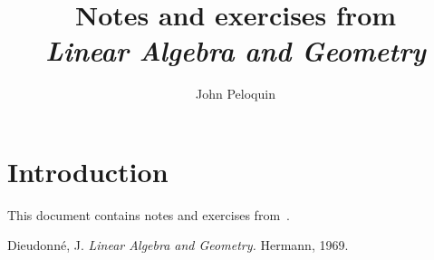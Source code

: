 \documentclass[letterpaper,12pt]{article}
\title{Notes and exercises from\\\textit{Linear Algebra and Geometry}}
\author{John Peloquin}
\date{}
\theoremstyle{definition}
\theoremstyle{remark}
\begin{document}
\maketitle

\section*{Introduction}
This document contains notes and exercises from~\cite{dieudonne}.

\begin{thebibliography}{0}
 Dieudonn\'e, J. \textit{Linear Algebra and Geometry.} Hermann, 1969.
\end{thebibliography}
\end{document}
